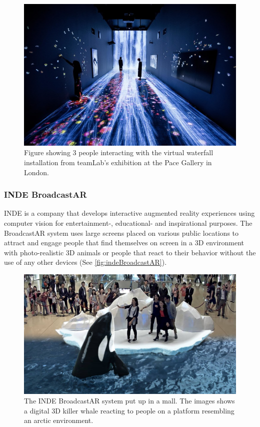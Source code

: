         \begin{figure}[H]
        	\centering
        	\includegraphics[width=0.9\linewidth]{figure/Analysis/transcendingBoundaries.jpg}
        	\caption{Figure showing 3 people interacting with the virtual waterfall installation from teamLab's exhibition at the Pace Gallery in London\cite{transcendingBoundries}.}
        	\label{fig:transcendingBoundaries}
        \end{figure}
  
        \subsubsection{INDE BroadcastAR} %
            INDE is a company that develops interactive augmented reality experiences using computer vision for entertainment-, educational- and inspirational purposes\cite{indeBroadcastAR}. The BroadcastAR system uses large screens placed on various public locations to attract and engage people that find themselves on screen in a 3D environment with photo-realistic 3D animals or people that react to their behavior without the use of any other devices (See \autoref{fig:indeBroadcastAR}).

            \begin{figure}[H]
            	\centering
            	\includegraphics[width=0.9\linewidth]{figure/Analysis/inde.jpg}
            	\caption{The INDE BroadcastAR system put up in a mall. The images shows a digital 3D killer whale reacting to people on a platform resembling an arctic environment\cite{indeBroadcastAR}.}
            	\label{fig:indeBroadcastAR}
            \end{figure}

